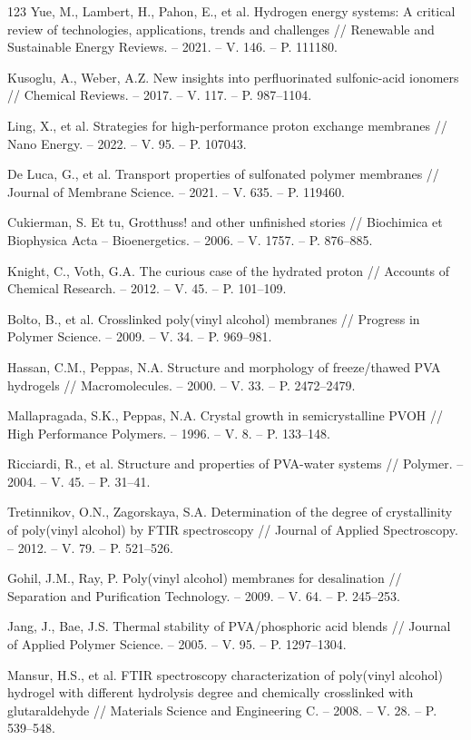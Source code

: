\documentclass[12pt,a4paper]{report}
\begin{document}
\begin{thebibliography}{123}
 Yue, M., Lambert, H., Pahon, E., et al. Hydrogen energy systems: A critical review of technologies, applications, trends and challenges // Renewable and Sustainable Energy Reviews. – 2021. – V. 146. – P. 111180.

 Kusoglu, A., Weber, A.Z. New insights into perfluorinated sulfonic-acid ionomers // Chemical Reviews. – 2017. – V. 117. – P. 987–1104.

 Ling, X., et al. Strategies for high-performance proton exchange membranes // Nano Energy. – 2022. – V. 95. – P. 107043.

 De Luca, G., et al. Transport properties of sulfonated polymer membranes // Journal of Membrane Science. – 2021. – V. 635. – P. 119460.

 Cukierman, S. Et tu, Grotthuss! and other unfinished stories // Biochimica et Biophysica Acta – Bioenergetics. – 2006. – V. 1757. – P. 876–885.

 Knight, C., Voth, G.A. The curious case of the hydrated proton // Accounts of Chemical Research. – 2012. – V. 45. – P. 101–109.

 Bolto, B., et al. Crosslinked poly(vinyl alcohol) membranes // Progress in Polymer Science. – 2009. – V. 34. – P. 969–981.

 Hassan, C.M., Peppas, N.A. Structure and morphology of freeze/thawed PVA hydrogels // Macromolecules. – 2000. – V. 33. – P. 2472–2479.

 Mallapragada, S.K., Peppas, N.A. Crystal growth in semicrystalline PVOH // High Performance Polymers. – 1996. – V. 8. – P. 133–148.

 Ricciardi, R., et al. Structure and properties of PVA-water systems // Polymer. – 2004. – V. 45. – P. 31–41.

 Tretinnikov, O.N., Zagorskaya, S.A. Determination of the degree of crystallinity of poly(vinyl alcohol) by FTIR spectroscopy // Journal of Applied Spectroscopy. – 2012. – V. 79. – P. 521–526.

 Gohil, J.M., Ray, P. Poly(vinyl alcohol) membranes for desalination // Separation and Purification Technology. – 2009. – V. 64. – P. 245–253.

 Jang, J., Bae, J.S. Thermal stability of PVA/phosphoric acid blends // Journal of Applied Polymer Science. – 2005. – V. 95. – P. 1297–1304.

 Mansur, H.S., et al. FTIR spectroscopy characterization of poly(vinyl alcohol) hydrogel with different hydrolysis degree and chemically crosslinked with glutaraldehyde // Materials Science and Engineering C. – 2008. – V. 28. – P. 539–548.


\end{thebibliography}
\end{document}
